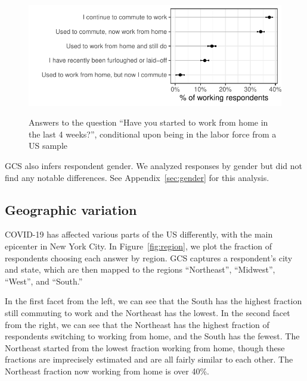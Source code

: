 \documentclass[12pt]{article}
\begin{document}
\begin{figure}
  \caption{Answers to the question ``Have you started to work from home in the last 4 weeks?'', conditional upon being in the labor force from a US sample} \label{fig:working_summary}
\centering
\begin{minipage}{1.1 \linewidth}
  \includegraphics[width = \linewidth]{plots/working_summary.pdf} \\
  \begin{footnotesize}
    \end{footnotesize}
\end{minipage}
\end{figure} 

GCS also infers respondent gender.
We analyzed responses by gender but did not find any notable differences.
See Appendix~\ref{sec:gender} for this analysis. 

\subsection{Geographic variation} 
COVID-19 has affected various parts of the US differently, with the main epicenter in New York City.
In Figure~\ref{fig:region}, we plot the fraction of respondents choosing each answer by region.
GCS captures a respondent's city and state, which are then mapped to the regions ``Northeast'', ``Midwest'', ``West'', and ``South.'' 

In the first facet from the left, we can see that the South has the highest fraction still commuting to work and the Northeast has the lowest. 
In the second facet from the right, we can see that the Northeast has the highest fraction of respondents switching to working from home, and the South has the fewest.
The Northeast started from the lowest fraction working from home, though these fractions are imprecisely estimated and are all fairly similar to each other. 
The Northeast fraction now working from home is over 40\%. 
\end{document}
